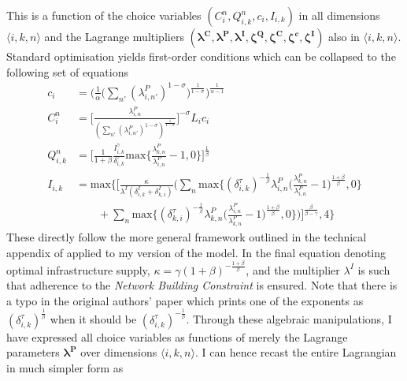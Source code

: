 \documentclass[11pt, oneside]{article}   	%
\begin{document}
This is a function of the choice variables $(C_{i}^{n}, Q_{i,k}^{n}, c_{i}, I_{i,k})$ in all dimensions $\langle i,k,n \rangle$ and the Lagrange multipliers $(\bm{\lambda^{C}}, \bm{\lambda^{P}}, \bm{\lambda^{I}}, \bm{\zeta^{Q}}, \bm{\zeta^{C}}, \bm{\zeta^{c}}, \bm{\zeta^{I}})$ also in $\langle i,k,n \rangle$. Standard optimisation yields first-order conditions which can be collapsed to the following set of equations
\begin{equation}
    \label{eq:foc}
  \begin{aligned}
    c_{i} & = \bigg( \frac{1}{\alpha} \Big( \sum_{n'}^{} (\lambda^{P}_{i,n'})^{1-\sigma}\Big)^{\frac{1}{1-\sigma}}\bigg)^{\frac{1}{\alpha-1}} \\
    C_{i}^{n} & = \Bigg[ \frac{\lambda^{P}_{i,n}}{(\sum_{n'}^{} (\lambda^{P}_{i,n'})^{1-\sigma})^{\frac{1}{1-\sigma}}} \Bigg]^{-\sigma}L_{i}c_{i} \\
    Q_{i,k}^{n} & = \Bigg[\frac{1}{1+\beta} \frac{I_{i,k}^{\gamma}}{\delta_{i,k}^{\tau}} \textrm{max}\Big\{\frac{\lambda^{P}_{k,n}}{\lambda^{P}_{i,n}}-1,0\Big\}\Bigg]^{\frac{1}{\beta}} \\
    I_{i,k} & = \textrm{max}\Bigg\{\Bigg[ \frac{\kappa}{\lambda^{I}(\delta^{I}_{i,k} + \delta^{I}_{k,i})} \bigg( \sum_{n}^{} \textrm{max}\Big\{ (\delta^{\tau}_{i,k})^{-\frac{1}{\beta}} \lambda^{P}_{i,n} \Big( \frac{\lambda^{P}_{k,n}}{\lambda^{P}_{i,n}}-1 \Big)^{\frac{1+\beta}{\beta}} , 0\Big\} \\
    & \qquad + \sum_{n}^{} \textrm{max}\Big\{ (\delta^{\tau}_{k,i})^{-\frac{1}{\beta}} \lambda^{P}_{k,n} \Big( \frac{\lambda^{P}_{i,n}}{\lambda^{P}_{k,n}}-1 \Big)^{\frac{1+\beta}{\beta}} , 0\Big\} \bigg) \Bigg]^{\frac{\beta}{\beta-\gamma}}, 4\Bigg\}
  \end{aligned}
\end{equation}
These directly follow the more general framework outlined in the technical appendix of \citeauthor{fajgelbaum_optimal_2017} applied to my version of the model. In the final equation denoting optimal infrastructure supply, $\kappa = \gamma(1+\beta)^{-\frac{1+\beta}{\beta}}$, and the multiplier $\lambda^{I}$ is such that adherence to the \emph{Network Building Constraint} is ensured. Note that there is a typo in the original authors' paper which prints one of the exponents as $(\delta^{\tau}_{i,k})^{\frac{1}{\beta}}$ when it should be $(\delta^{\tau}_{i,k})^{-\frac{1}{\beta}}$. Through these algebraic manipulations, I have expressed all choice variables as functions of merely the Lagrange parameters $\bm{\lambda^{P}}$ over dimensions $\langle i,k,n \rangle$. I can hence recast the entire Lagrangian in much simpler form as
\end{document}
